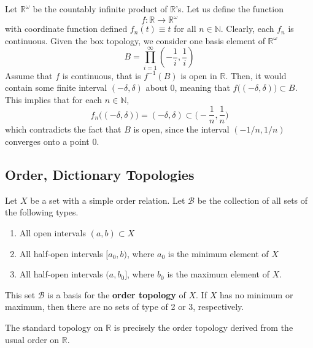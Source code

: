     \begin{example}
    Let $\mathbb{R}^\omega$ be the countably infinite product of $\mathbb{R}$'s. Let us define the function 
    \[f: \mathbb{R} \longrightarrow \mathbb{R}^\omega\]
    with coordinate function defined $f_n (t) \equiv t$ for all $n \in \mathbb{N}$. Clearly, each $f_n$ is continuous. Given the box topology, we consider one basis element of $\mathbb{R}^\omega$
    \[B = \prod_{i=1}^\infty (-\frac{1}{i}, \frac{1}{i})\]
    Assume that $f$ is continuous, that is $f^{-1}(B)$ is open in $\mathbb{R}$. Then, it would contain some finite interval $(-\delta, \delta)$ about $0$, meaning that $f\big( (-\delta, \delta)\big) \subset B$. This implies that for each $n \in \mathbb{N}$, 
    \[f_n \big( (-\delta, \delta) \big) = (-\delta, \delta) \subset \Big( -\frac{1}{n}, \frac{1}{n} \Big)\]
    which contradicts the fact that $B$ is open, since the interval $(-1/n, 1/n)$ converges onto a point $0$. 
    \end{example}

  \subsection{Order, Dictionary Topologies} 

    \begin{definition}
      Let $X$ be a set with a simple order relation. Let $\mathscr{B}$ be the collection of all sets of the following types. 
      \begin{enumerate}
        \item All open intervals $(a, b) \subset X$
        \item All half-open intervals $[a_0, b)$, where $a_0$ is the minimum element of $X$
        \item All half-open intervals $(a, b_0]$, where $b_0$ is the maximum element of $X$. 
      \end{enumerate}
      This set $\mathscr{B}$ is a basis for the \textbf{order topology} of $X$. If $X$ has no minimum or maximum, then there are no sets of type of 2 or 3, respectively. 
    \end{definition}

    \begin{example}
      The standard topology on $\mathbb{R}$ is precisely the order topology derived from the usual order on $\mathbb{R}$. 
    \end{example}

